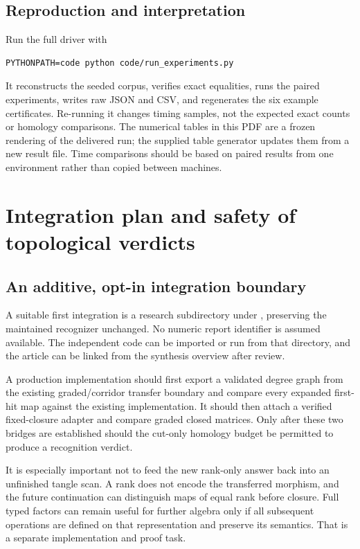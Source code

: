 \documentclass[11pt,letterpaper]{article}
\theoremstyle{definition}\newtheorem{definition}[theorem]{Definition}
\theoremstyle{remark}\newtheorem{remark}[theorem]{Remark}
\begin{document}
\subsection{Reproduction and interpretation}
Run the full driver with
\begin{lstlisting}
PYTHONPATH=code python code/run_experiments.py
\end{lstlisting}
It reconstructs the seeded corpus, verifies exact equalities, runs the paired
experiments, writes raw JSON and CSV, and regenerates the six example
certificates. Re-running it changes timing samples, not the expected exact
counts or homology comparisons. The numerical tables in this PDF are a
frozen rendering of the delivered run; the supplied table generator updates
them from a new result file. Time comparisons should be based on paired
results from one environment rather than copied between machines.

\section{Integration plan and safety of topological verdicts}
\subsection{An additive, opt-in integration boundary}
A suitable first integration is a research subdirectory under
, preserving
the maintained recognizer unchanged. No numeric report identifier is assumed
available. The independent code can be imported or run from that directory,
and the article can be linked from the synthesis overview after review.

A production implementation should first export a validated degree graph
from the existing graded/corridor transfer boundary and compare every
expanded first-hit map against the existing implementation. It should then
attach a verified fixed-closure adapter and compare graded closed matrices.
Only after these two bridges are established should the cut-only homology
budget be permitted to produce a recognition verdict.

It is especially important not to feed the new rank-only answer back into
an unfinished tangle scan. A rank does not encode the transferred morphism,
and the future continuation can distinguish maps of equal rank before
closure. Full typed factors can remain useful for further algebra only if
all subsequent operations are defined on that representation and preserve
its semantics. That is a separate implementation and proof task.
\end{document}
